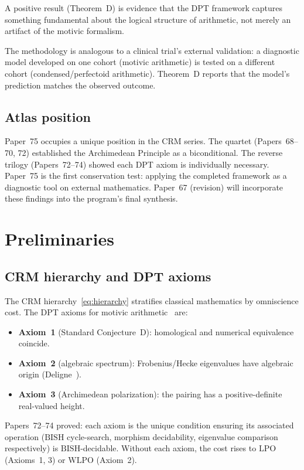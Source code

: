 \documentclass[12pt, a4paper]{article}
\theoremstyle{plain}
\theoremstyle{definition}
\theoremstyle{remark}
\newcommand{\BISH}{\mathrm{BISH}}
\newcommand{\WLPO}{\mathrm{WLPO}}
\newcommand{\LPO}{\mathrm{LPO}}
\begin{document}
A positive result (Theorem~D) is evidence that the DPT framework
captures something fundamental about the logical structure of
arithmetic, not merely an artifact of the motivic formalism.

The methodology is analogous to a clinical trial's external
validation: a diagnostic model developed on one cohort (motivic
arithmetic) is tested on a different cohort (condensed/perfectoid
arithmetic).  Theorem~D reports that the model's prediction
matches the observed outcome.

\subsection{Atlas position}

Paper~75 occupies a unique position in the CRM series.  The quartet
(Papers~68--70, 72) established the Archimedean Principle as a
biconditional.  The reverse trilogy (Papers~72--74) showed each DPT
axiom is individually necessary.  Paper~75 is the first conservation
test: applying the completed framework as a diagnostic tool on
external mathematics.  Paper~67 (revision) will incorporate these
findings into the program's final synthesis.

\section{Preliminaries}\label{sec:prelim}

\subsection{CRM hierarchy and DPT axioms}

The CRM hierarchy~\eqref{eq:hierarchy} stratifies classical
mathematics by omniscience cost.  The DPT axioms for motivic
arithmetic~\cite{lee-p45, lee-p50} are:
\begin{itemize}
  \item \textbf{Axiom~1} (Standard Conjecture~D): homological
    and numerical equivalence coincide.
  \item \textbf{Axiom~2} (algebraic spectrum): Frobenius/Hecke
    eigenvalues have algebraic origin
    (Deligne~\cite{deligne-weil1, deligne-weil2}).
  \item \textbf{Axiom~3} (Archimedean polarization): the pairing
    has a positive-definite real-valued height.
\end{itemize}
Papers~72--74 proved: each axiom is the unique condition ensuring
its associated operation ($\BISH$ cycle-search, morphism decidability,
eigenvalue comparison respectively) is $\BISH$-decidable.  Without
each axiom, the cost rises to $\LPO$ (Axioms~1, 3) or $\WLPO$
(Axiom~2).
\end{document}

